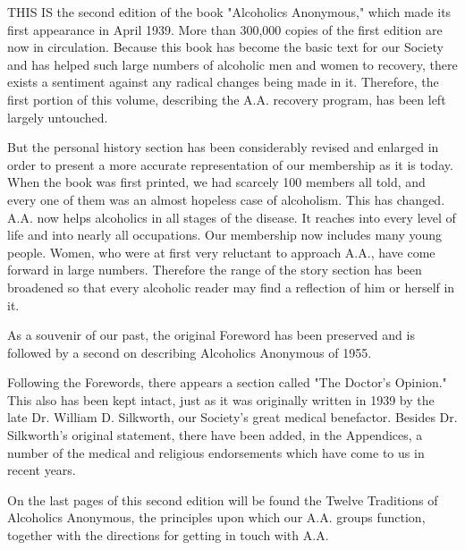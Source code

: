 
\bbChapterPreamble



\begin{biblechapter}
    THIS IS the second edition of the book "Alcoholics Anonymous," 
    which made its first appearance in April 1939.
\verse More than 300,000 copies of the first edition are now in circulation.
\verse Because this book has become 
    the basic text for our Society 
    and has helped such large numbers 
    of alcoholic men and women to recovery, 
    there exists a sentiment against any radical changes being made in it.
\verse Therefore, the first portion of this volume, 
    describing the A.A. recovery program, 
    has been left largely untouched.

    But the personal history section has been considerably revised 
    and enlarged
    in order to present a more accurate representation of 
    our membership as it is today.
\verse When the book was first printed, 
    we had scarcely 100 members all told, 
    and every one of them was an almost hopeless case of alcoholism. 
\verse This has changed.
\verse A.A. now helps alcoholics in all stages of the disease.
\verse It reaches into every level of life 
    and into nearly all occupations.
\verse Our membership now includes many young people.
\verse Women, who were at first very reluctant to approach A.A., 
    have come forward in large numbers.
\verse Therefore the range of the story section has been broadened 
    so that every alcoholic reader may find a reflection 
    of him or herself in it.

    As a souvenir of our past, 
    the original Foreword has been preserved 
    and is followed by a second 
    on describing Alcoholics Anonymous of 1955.

    Following the Forewords, 
    there appears a section called "The Doctor's Opinion."  
    This also has been kept intact, 
    just as it was originally written in 1939 
    by the late Dr. William D. Silkworth, 
    our Society's great medical benefactor. 
\verse Besides Dr. Silkworth's original statement, 
    there have been added, 
    in the Appendices,
    a number of the medical and religious endorsements
    which have come to us in recent years.

    On the last pages of this second edition 
    will be found the Twelve Traditions of Alcoholics Anonymous, 
    the principles upon which our A.A. groups function, 
    together with the directions for getting in touch with A.A.
\end{biblechapter}
